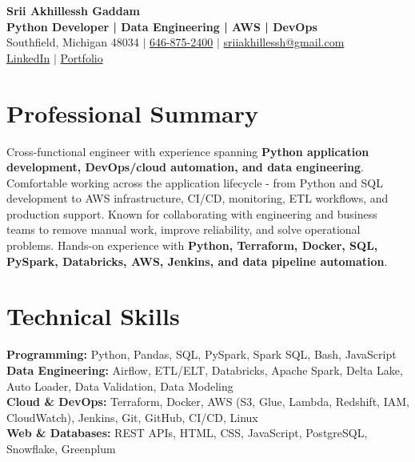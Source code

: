 \documentclass[letterpaper,10pt]{article}
\begin{document}
\fontsize{9.35pt}{10.45pt}\selectfont

\begin{center}
    {\LARGE \textbf{Srii Akhillessh Gaddam}} \\[-1pt]
    \textbf{Python Developer | Data Engineering | AWS | DevOps} \\[2pt]
    Southfield, Michigan 48034 $|$
    \href{tel:6468752400}{646-875-2400} $|$
    \href{mailto:sriiakhillessh@gmail.com}{sriiakhillessh@gmail.com} \\[1pt]
    \href{https://www.linkedin.com/in/srii-akhiilessh-gaddam-b48668191/}{LinkedIn} $|$
    \href{https://sriiakhillesshg.github.io/portfolio/}{Portfolio}
\end{center}
\vspace{-8pt}

\section{Professional Summary}
\small{Cross-functional engineer with experience spanning \textbf{Python application development, DevOps/cloud automation, and data engineering}. Comfortable working across the application lifecycle - from Python and SQL development to AWS infrastructure, CI/CD, monitoring, ETL workflows, and production support. Known for collaborating with engineering and business teams to remove manual work, improve reliability, and solve operational problems. Hands-on experience with \textbf{Python, Terraform, Docker, SQL, PySpark, Databricks, AWS, Jenkins, and data pipeline automation}.}

\section{Technical Skills}
\small{
\textbf{Programming:} Python, Pandas, SQL, PySpark, Spark SQL, Bash, JavaScript \\
\textbf{Data Engineering:} Airflow, ETL/ELT, Databricks, Apache Spark, Delta Lake, Auto Loader, Data Validation, Data Modeling \\
\textbf{Cloud \& DevOps:} Terraform, Docker, AWS (S3, Glue, Lambda, Redshift, IAM, CloudWatch), Jenkins, Git, GitHub, CI/CD, Linux \\
\textbf{Web \& Databases:} REST APIs, HTML, CSS, JavaScript, PostgreSQL, Snowflake, Greenplum
}
\end{document}

